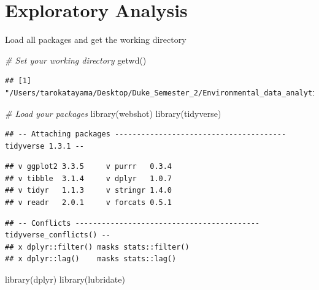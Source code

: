 \documentclass[
  12pt,
]{article}
\newenvironment{Shaded}{\begin{snugshade}}{\end{snugshade}}
\newcommand{\CommentTok}[1]{\textcolor[rgb]{0.56,0.35,0.01}{\textit{#1}}}
\newcommand{\FunctionTok}[1]{\textcolor[rgb]{0.00,0.00,0.00}{#1}}
\newcommand{\NormalTok}[1]{#1}
\begin{document}
\newpage

\hypertarget{exploratory-analysis}{%
\section{Exploratory Analysis}\label{exploratory-analysis}}

Load all packages and get the working directory

\begin{Shaded}
\begin{Highlighting}[]
\CommentTok{\# Set your working directory}
\FunctionTok{getwd}\NormalTok{()}
\end{Highlighting}
\end{Shaded}

\begin{verbatim}
## [1] "/Users/tarokatayama/Desktop/Duke_Semester_2/Environmental_data_analytics/R_Projects/KatayamaNgenziThornton_ENV872_EDA_FinalProject"
\end{verbatim}

\begin{Shaded}
\begin{Highlighting}[]
\CommentTok{\# Load your packages}
\FunctionTok{library}\NormalTok{(webshot)}
\FunctionTok{library}\NormalTok{(tidyverse)}
\end{Highlighting}
\end{Shaded}

\begin{verbatim}
## -- Attaching packages --------------------------------------- tidyverse 1.3.1 --
\end{verbatim}

\begin{verbatim}
## v ggplot2 3.3.5     v purrr   0.3.4
## v tibble  3.1.4     v dplyr   1.0.7
## v tidyr   1.1.3     v stringr 1.4.0
## v readr   2.0.1     v forcats 0.5.1
\end{verbatim}

\begin{verbatim}
## -- Conflicts ------------------------------------------ tidyverse_conflicts() --
## x dplyr::filter() masks stats::filter()
## x dplyr::lag()    masks stats::lag()
\end{verbatim}

\begin{Shaded}
\begin{Highlighting}[]
\FunctionTok{library}\NormalTok{(dplyr)}
\FunctionTok{library}\NormalTok{(lubridate)}
\end{Highlighting}
\end{Shaded}
\end{document}
